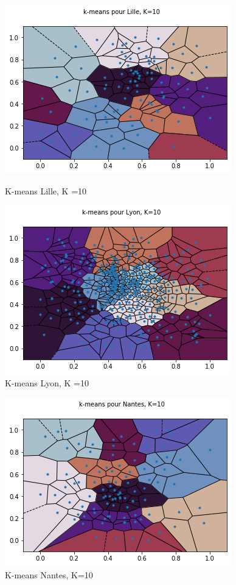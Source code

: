 \documentclass{report}
\begin{document}
  \begin{figure}[H]
    \begin{minipage}{0.4\textwidth}
      \centering
      \includegraphics[scale=0.5]{images/k-means-lille.png}
      \caption{K-means Lille, K =10}\label{Fig:Data1}
    \end{minipage}\hfill
    \begin{minipage}{0.4\textwidth}
      \centering
      \includegraphics[scale=0.5]{images/k-means-lyon.png}
      \caption{K-means Lyon, K =10}\label{Fig:Data2}
    \end{minipage}
  \end{figure}
  \begin{figure}[H]
    \centering
    \includegraphics[scale=0.5]{images/k-means-nantes.png}
    \caption{K-means Nantes, K=10 }
  \end{figure}
\end{document}

